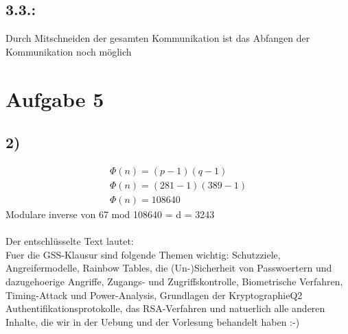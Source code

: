 \documentclass[a4paper,11pt,parskip=half]{scrartcl}
\begin{document}
\subsection{3.3.:}
Durch Mitschneiden der gesamten Kommunikation ist das Abfangen der Kommunikation noch möglich


\section*{Aufgabe 5}
\subsection*{2)}
\begin{align}
\Phi(n) = (p-1)(q-1)\\
\Phi(n) = (281-1)(389-1)\\
\Phi(n) = 108640
\end{align}
Modulare inverse von 67 mod 108640 = d = 3243
\\\\
Der entschlüsselte Text lautet:
\\
Fuer die GSS-Klausur sind folgende Themen wichtig: Schutzziele, Angreifermodelle, Rainbow Tables, die (Un-)Sicherheit von Passwoertern und dazugehoerige Angriffe, Zugangs- und Zugriffskontrolle, Biometrische Verfahren, Timing-Attack und Power-Analysis, Grundlagen der KryptographieQ2 Authentifikationsprotokolle, das RSA-Verfahren und natuerlich alle anderen Inhalte, die wir in der Uebung und der Vorlesung behandelt haben :-)
\end{document}
